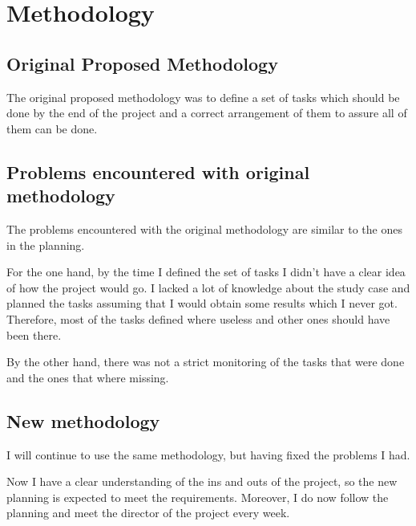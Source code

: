 \documentclass{article}
\begin{document}
\section{Methodology}
    \subsection{Original Proposed Methodology}
    The original proposed methodology was to define a set of tasks which should
    be done by the end of the project and a correct arrangement of them to
    assure all of them can be done.
    \subsection{Problems encountered with original methodology}
    The problems encountered with the original methodology are similar to the
    ones in the planning.

    For the one hand, by the time I defined the set of tasks I didn't have a
    clear idea of how the project would go. I lacked a lot of knowledge about
    the study case and planned the tasks assuming that I would obtain some results
    which I never got. Therefore, most of the tasks defined where useless and
    other ones should have been there.

    By the other hand, there was not a strict monitoring of the tasks that were
    done  and the ones that where missing.
    \subsection{New methodology}

    I will continue to use the same methodology, but having fixed the problems
    I had.

    Now I have a clear understanding of the ins and outs of the project, so the
    new planning is expected to meet the requirements. Moreover, I do
    now follow the planning and meet the director of the project every week.


%
%
%
%
\end{document}
